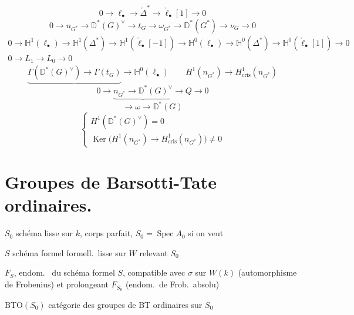 \documentclass[11pt,a4paper]{article}
\begin{document}
\[
0 \to \ell_\bullet \to \check{\Delta}^* \to \check{\ell}_\bullet[1] \to 0
\]
\[
0 \to n_{G^{*}} \to \mathbb{D}^{*}(G)^{\vee} \to t_G \to \omega_{G^{*}} \to
\mathbb{D}^{*}(G^{*}) \to \nu_G \to 0
\]
\[
\begin{gathered}
0 \to \mathbb{H}^1(\ell_\bullet) \to \mathbb{H}^1(\Delta^*) \to
\mathbb{H}^1(\check{\ell}_\bullet[-1]) \to \mathbb{H}^0(\ell_\bullet) \to
\mathbb{H}^0(\Delta^*) \to \mathbb{H}^0(\check{\ell}_\bullet[1]) \to 0 \\
0 \to L_1 \to L_0 \to 0
\end{gathered}
\]
\[
\underbrace{\Gamma(\mathbb{D}^{*}(G)^{\vee}) \to \Gamma(t_G)}\to \mathbb{H}^0(\ell_\bullet)
\qquad
H^1(n_{G^{*}}) \to H^1_{\mathrm{cris}}(n_{G^{*}})
\]
\[
0 \to \underbrace{n_{G^{*}} \to \mathbb{D}^{*}(G)^{\vee}} \to Q \to 0
\]
\[
\to \omega \to \mathbb{D}^{*}(G)
\]
\[
\begin{cases}
H^1(\mathbb{D}^{*}(G)^{\vee}) = 0 \\
\operatorname{Ker}\bigl(H^1(n_{G^{*}}) \to H^1_{\mathrm{cris}}(n_{G^{*}})\bigr) \neq 0
\end{cases}
\]


\section*{Groupes de Barsotti-Tate ordinaires.}

$S_0$ schéma lisse sur $k$, corps parfait, $S_0 = \operatorname{Spec} A_0$
si on veut

$S$ schéma formel formell.\ lisse sur $W$ relevant $S_0$

$F_S$, endom.\  du schéma formel $S$, compatible avec
$\sigma$ sur $W(k)$ (automorphisme de Frobenius) et prolongeant $F_{S_0}$
(endom.\ de Frob.\ absolu)

$\mathrm{BTO}(S_0)$ catégorie des groupes de BT ordinaires sur $S_0$
\end{document}
